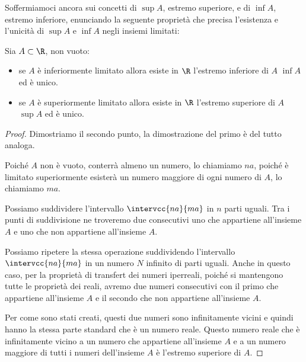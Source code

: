 Soffermiamoci ancora sui concetti di \(\sup{A}\), estremo superiore, e 
di \(\inf{A}\), 
estremo inferiore, enunciando la seguente proprietà che precisa l'esistenza e 
l'unicità di \(\sup{A}\) e \(\inf{A}\) negli insiemi limitati:
\begin{newtheo}
Sia \(A\subset\R\), non vuoto:
\begin{itemize} [nosep]
\item se \(A\) è inferiormente limitato allora esiste in \(\R\) 
l'estremo inferiore di \(A\) \(\inf{A}\) ed è unico.
\item se \(A\) è superiormente limitato allora esiste in \(\R\) 
l'estremo superiore di \(A\) \(\sup{A}\) ed è unico.
\end{itemize}
\end{newtheo}
\begin{proof}
Dimostriamo il secondo punto, la dimostrazione del primo è del tutto analoga.

Poiché \(A\) non è vuoto, conterrà almeno un numero, lo chiamiamo \(na\), 
poiché è limitato superiormente esisterà un numero maggiore di ogni numero di 
\(A\), lo chiamiamo \(ma\).

Possiamo suddividere l'intervallo \(\intervcc{na}{ma}\) in \(n\) parti uguali.
Tra i punti di suddivisione ne troveremo due consecutivi uno che appartiene 
all'insieme \(A\) e uno che non appartiene all'insieme \(A\).

Possiamo  ripetere la stessa operazione suddividendo l'intervallo 
\(\intervcc{na}{ma}\) in un numero \(N\) infinito di parti uguali.
Anche in questo caso, per la proprietà di transfert dei numeri iperreali, 
poiché si mantengono tutte le proprietà dei reali, avremo due numeri 
consecutivi con il primo che appartiene all'insieme \(A\) e il secondo che non 
appartiene all'insieme \(A\).

Per come sono stati creati, questi due numeri sono infinitamente vicini e 
quindi hanno la stessa parte standard che è un numero reale.
Questo numero reale che è infinitamente vicino a un numero che appartiene 
all'insieme \(A\) e a un numero maggiore di tutti i numeri dell'insieme \(A\) 
è l'estremo superiore di \(A\).
\end{proof}


